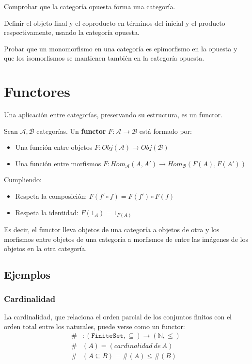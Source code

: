 \documentclass[11pt, fleqn, spanish]{book}
\begin{document}
  \begin{exercise} 
    Comprobar que la categoría opuesta forma una categoría.
  \end{exercise}
  \begin{exercise} 
    Definir el objeto final y el coproducto en términos del inicial y el producto 
    respectivamente, usando la categoría opuesta.
  \end{exercise}
  \begin{exercise} 
    Probar que un monomorfismo en una categoría es epimorfismo en la opuesta
    y que los isomorfismos se mantienen también en la categoría opuesta.
  \end{exercise}

 
  \section {Functores}
  Una aplicación entre categorías, preservando su estructura, es un functor.
  \begin{definition} Sean $\mathcal{A}, \mathcal{B}$ categorías. Un \textbf{functor} 
  $F: \mathcal{A} \rightarrow \mathcal{B}$ está formado por:
  \begin{itemize}
   \item Una función entre objetos $F: Obj(\mathcal{A}) \rightarrow Obj(\mathcal{B})$
   \item Una función entre morfismos $F: Hom_\mathcal{A}(A,A') \rightarrow Hom_\mathcal{B}(F(A),F(A'))$
  \end{itemize}
  Cumpliendo:
  \begin{itemize}
   \item Respeta la composición: $F(f' \circ f) = F(f') \circ F(f)$
   \item Respeta la identidad: $F(1_A) = 1_{F(A)}$
  \end{itemize}
  \end{definition}

  Es decir, el functor lleva objetos de una categoría a objetos de otra y los morfismos
  entre objetos de una categoría a morfismos de entre las imágenes de los objetos en la
  otra categoría.

  \subsection {Ejemplos}
    \subsubsection{Cardinalidad}
      La cardinalidad, que relaciona el orden parcial de los conjuntos finitos con el
      orden total entre los naturales, puede verse como un functor:
      \begin{align*}
	\#&: \mathtt{(FiniteSet,\subseteq)} \rightarrow \mathtt{(\mathbb{N},\leq)} \\
	\#&(A) = (cardinalidad\ de\ A) \\
	\#&(A \subseteq B) = \#(A) \leq \#(B) 
      \end{align*}
    
\end{document}
